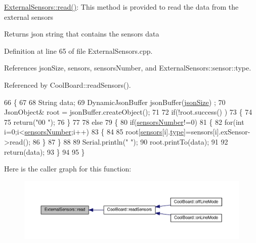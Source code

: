 \hyperlink{classExternalSensors_a53177b81eca3be89508b5511ddcd00fc}{External\+Sensors\+::read()}\+: This method is provided to read the data from the external sensors

\begin{DoxyReturn}{Returns}
json string that contains the sensors data 
\end{DoxyReturn}


Definition at line 65 of file External\+Sensors.\+cpp.



References json\+Size, sensors, sensors\+Number, and External\+Sensors\+::sensor\+::type.



Referenced by Cool\+Board\+::read\+Sensors().


\begin{DoxyCode}
66 \{
67 
68     String data;
69     DynamicJsonBuffer  jsonBuffer(\hyperlink{classExternalSensors_acacea86d74d967b57fcff282d26cff57}{jsonSize}) ;
70     JsonObject& root = jsonBuffer.createObject();
71 
72     \textcolor{keywordflow}{if}(!root.success() )
73     \{
74 
75      \textcolor{keywordflow}{return}(\textcolor{stringliteral}{"00 "});
76     \}
77 
78     \textcolor{keywordflow}{else}
79     \{
80         \textcolor{keywordflow}{if}(\hyperlink{classExternalSensors_a58e4fbf9adeae787d92be5fa33043b5d}{sensorsNumber}!=0)
81         \{
82             \textcolor{keywordflow}{for}(\textcolor{keywordtype}{int} i=0;i<\hyperlink{classExternalSensors_a58e4fbf9adeae787d92be5fa33043b5d}{sensorsNumber};i++)
83             \{
84             
85                 root[\hyperlink{classExternalSensors_a284233f884fcf00154a44740cf1d9e1e}{sensors}[i].\hyperlink{structExternalSensors_1_1sensor_a6acfdb02c742c2110d7bd2b5d9fce9e7}{type}]=sensors[i].exSensor->read();       
86             \}
87         \}   
88         
89         Serial.println(\textcolor{stringliteral}{" "});
90         root.printTo(data);
91     
92         \textcolor{keywordflow}{return}(data);
93     \}
94 
95 \}
\end{DoxyCode}
Here is the caller graph for this function\+:
\nopagebreak
\begin{figure}[H]
\begin{center}
\leavevmode
\includegraphics[width=350pt]{classExternalSensors_a53177b81eca3be89508b5511ddcd00fc_icgraph}
\end{center}
\end{figure}


